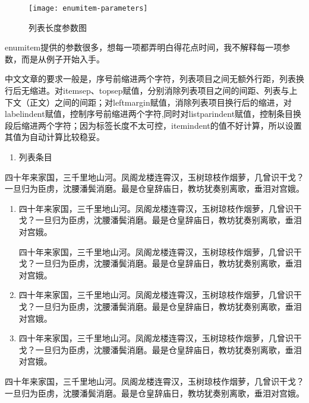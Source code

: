 \begin{figure}[!htb]
    \centering
    \texttt{[image: enumitem-parameters]}
    \caption{列表长度参数图}
\end{figure}

enumitem提供的参数很多，想每一项都弄明白得花点时间，我不解释每一项参数，而是从例子开始入手。

中文文章的要求一般是，序号前缩进两个字符，列表项目之间无额外行距，列表换行后无缩进。对itemsep、topsep赋值，分别消除列表项目之间的间距、列表与上下文（正文）之间的间距；对leftmargin赋值，消除列表项目换行后的缩进，对labelindent赋值，控制序号前缩进两个字符,同时对listparindent赋值，控制条目换段后缩进两个字符；因为标签长度不太可控，itemindent的值不好计算，所以设置其值为自动计算比较稳妥。

\begin{latex}
\begin{enumerate}[label=(\arabic*),itemsep=0pt,parsep=0pt,topsep=0pt,leftmargin=0pt,labelindent=\parindent,listparindent=\parindent,itemindent=*]
\item 列表条目
\end{enumerate}
\end{latex}

四十年来家国，三千里地山河。凤阁龙楼连霄汉，玉树琼枝作烟萝，几曾识干戈？一旦归为臣虏，沈腰潘鬓消磨。最是仓皇辞庙日，教坊犹奏别离歌，垂泪对宫娥。
\begin{enumerate}[label=(\arabic*),itemsep=0pt,parsep=0pt,topsep=0pt,leftmargin=0pt,labelindent=\parindent,listparindent=\parindent,itemindent=*]
\item 四十年来家国，三千里地山河。凤阁龙楼连霄汉，玉树琼枝作烟萝，几曾识干戈？一旦归为臣虏，沈腰潘鬓消磨。最是仓皇辞庙日，教坊犹奏别离歌，垂泪对宫娥。

四十年来家国，三千里地山河。凤阁龙楼连霄汉，玉树琼枝作烟萝，几曾识干戈？一旦归为臣虏，沈腰潘鬓消磨。最是仓皇辞庙日，教坊犹奏别离歌，垂泪对宫娥。

\item 四十年来家国，三千里地山河。凤阁龙楼连霄汉，玉树琼枝作烟萝，几曾识干戈？一旦归为臣虏，沈腰潘鬓消磨。最是仓皇辞庙日，教坊犹奏别离歌，垂泪对宫娥。
\item 四十年来家国，三千里地山河。凤阁龙楼连霄汉，玉树琼枝作烟萝，几曾识干戈？一旦归为臣虏，沈腰潘鬓消磨。最是仓皇辞庙日，教坊犹奏别离歌，垂泪对宫娥。
\end{enumerate}

四十年来家国，三千里地山河。凤阁龙楼连霄汉，玉树琼枝作烟萝，几曾识干戈？一旦归为臣虏，沈腰潘鬓消磨。最是仓皇辞庙日，教坊犹奏别离歌，垂泪对宫娥。

